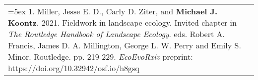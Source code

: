 \begin{longtable}{@{} >{\raggedright}p{6.10in} >{\raggedleft}X @{}}

\hangindent=5ex 1. Miller, Jesse E. D., Carly D. Ziter, and \textbf{Michael J. Koontz}. 2021. Fieldwork in landscape ecology. Invited chapter in \emph{The Routledge Handbook of Landscape Ecology}. eds. Robert A. Francis, James D. A. Millington, George L. W. Perry and Emily S. Minor. Routledge. pp. 219-229. \newline \emph{EcoEvoRxiv} preprint: https://doi.org/10.32942/osf.io/h8gsq & \tabularnewline

\end{longtable}
 